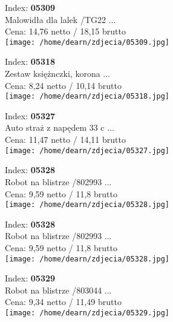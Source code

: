 {Index: \textbf{05309}\\
Malowidła dla lalek /TG22 ...\\
Cena: 14,76 netto / 18,15 brutto\\
  \texttt{[image: /home/dearn/zdjecia/05309.jpg]}}\newline\newline

{Index: \textbf{05318}\\
Zestaw księżnczki, korona ...\\
Cena: 8,24 netto / 10,14 brutto\\
  \texttt{[image: /home/dearn/zdjecia/05318.jpg]}}\newline\newline

{Index: \textbf{05327}\\
Auto straż z napędem 33 c ...\\
Cena: 11,47 netto / 14,11 brutto\\
  \texttt{[image: /home/dearn/zdjecia/05327.jpg]}}\newline\newline

{Index: \textbf{05328}\\
Robot na blistrze /802993 ...\\
Cena: 9,59 netto / 11,8 brutto\\
  \texttt{[image: /home/dearn/zdjecia/05328.jpg]}}\newline\newline

{Index: \textbf{05328}\\
Robot na blistrze /802993 ...\\
Cena: 9,59 netto / 11,8 brutto\\
  \texttt{[image: /home/dearn/zdjecia/05328.jpg]}}\newline\newline

{Index: \textbf{05329}\\
Robot na blistrze /803044 ...\\
Cena: 9,34 netto / 11,49 brutto\\
  \texttt{[image: /home/dearn/zdjecia/05329.jpg]}}\newline\newline


